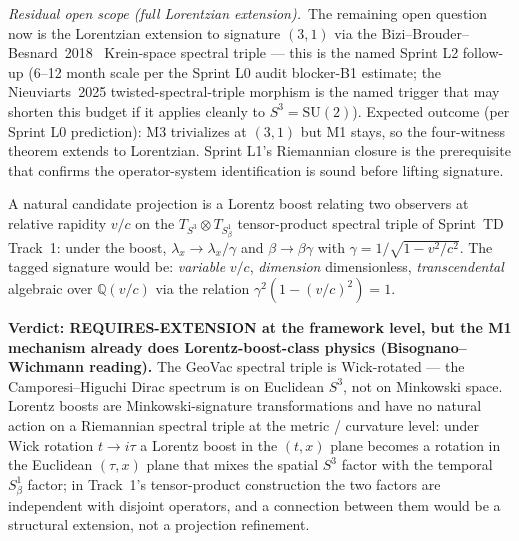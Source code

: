 \documentclass[11pt]{article}
\begin{document}
\begin{enumerate}
\medskip
\noindent\textit{Residual open scope (full Lorentzian extension).}\
The remaining open question now is the Lorentzian extension to
signature $(3, 1)$ via the
Bizi--Brouder--Besnard~2018~\cite{bizi_brouder_besnard2018}
Krein-space spectral triple --- this is the named Sprint L2 follow-up
(6--12 month scale per the Sprint L0 audit blocker-B1 estimate; the
Nieuviarts~2025 twisted-spectral-triple morphism is the named trigger
that may shorten this budget if it applies cleanly to $S^3 =
\mathrm{SU}(2)$).  Expected outcome (per Sprint L0 prediction):
M3 trivializes at $(3, 1)$ but M1 stays, so the four-witness theorem
extends to Lorentzian.  Sprint L1's Riemannian closure is the
prerequisite that confirms the operator-system identification is
sound before lifting signature.

A natural candidate projection is a Lorentz boost relating two
observers at relative rapidity $v/c$ on the
$T_{S^3} \otimes T_{S^1_\beta}$ tensor-product spectral triple of
Sprint~TD Track~1: under the boost, $\lambda_x \to \lambda_x / \gamma$
and $\beta \to \beta\gamma$ with $\gamma = 1/\sqrt{1 - v^2/c^2}$.
The tagged signature would be: \emph{variable} $v/c$, \emph{dimension}
dimensionless, \emph{transcendental} algebraic over $\mathbb{Q}(v/c)$
via the relation $\gamma^2 (1 - (v/c)^2) = 1$.

\textbf{Verdict: REQUIRES-EXTENSION at the framework level, but
the M1 mechanism already does Lorentz-boost-class physics
(Bisognano--Wichmann reading).}  The GeoVac spectral triple is
Wick-rotated --- the Camporesi--Higuchi Dirac spectrum is on
Euclidean $S^3$, not on Minkowski space.  Lorentz boosts are
Minkowski-signature transformations and have no natural action on a
Riemannian spectral triple at the metric / curvature level: under
Wick rotation $t \to i\tau$ a Lorentz boost in the $(t, x)$ plane
becomes a rotation in the Euclidean $(\tau, x)$ plane that mixes
the spatial $S^3$ factor with the temporal $S^1_\beta$ factor; in
Track~1's tensor-product construction the two factors are
independent with disjoint operators, and a connection between them
would be a structural extension, not a projection refinement.


\end{enumerate}
\end{document}
